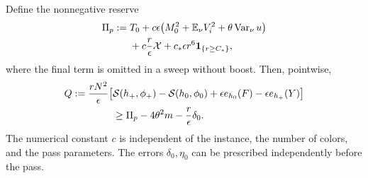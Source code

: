 \begin{proposition}
Define the nonnegative reserve
\begin{equation}
 \begin{split}
 \Pi_p:={}&
 T_0+c\epsilon\bigl(M_0^2+\mathbb E_\nu V_i^2+\theta\operatorname{Var}_\nu u\bigr)
       \\
 &+c\frac r\epsilon\mathcal X
       +c_*\epsilon r^6\mathbf 1_{\{r\ge C_*\}},
 \end{split}
 \label{eq:sweep-positive-reserve}
\end{equation}
where the final term is omitted in a sweep without boost.  Then,
pointwise,
\begin{align}
 Q:=\frac{rN^2}{\epsilon}\bigl[
 &\mathcal S(h_+,\phi_+)-\mathcal S(h_0,\phi_0)
       +\epsilon e_{h_0}(F)-\epsilon e_{h_+}(Y)\bigr]
 \notag\\
 &\ge\Pi_p-4\theta^2m-\frac r\epsilon\delta_0 .
 \label{eq:sweep-inequality}
\end{align}
The numerical constant \(c\) is independent of the instance, the
number of colors, and the pass parameters.  The errors
\(\delta_0,\eta_0\) can be prescribed independently before the pass.
\end{proposition}

